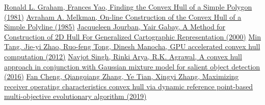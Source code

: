 \begin{thebibliography}{9}
    \href{https://mathweb.ucsd.edu/~ronspubs/83_09_convex_hull.pdf}
    {Ronald L. Graham, Frances Yao, Finding the Convex Hull of a Simple Polygon (1981)}
    \href{https://www.ime.usp.br/~walterfm/cursos/mac0331/2006/melkman.pdf}
    {Avraham A. Melkman, On-line Construction of the Convex Hull of a Simple Polyline (1985)}
    \href{https://www.isprs.org/proceedings/xxxiii/congress/part4/417_XXXIII-part4.pdf}
    {Jacqueleen Jourban, Yair Gabay, A Method for Construction of 2D Hull For Generalized Cartographic Representation (2000)}
    \href{https://www.sciencedirect.com/science/article/pii/S0097849312000544}
    {Min Tang, Jie-yi Zhao, Ruo-feng Tong, Dinesh Manocha, GPU accelerated convex hull computation (2012)}
     \href{https://www.sciencedirect.com/science/article/pii/S1051200416300318}
     {Navjot Singh, Rinki Arya, R.K. Agrawal, A convex hull approach in conjunction with Gaussian mixture model for salient object detection (2016)}
    \href{https://www.sciencedirect.com/science/article/pii/S1568494619306775}
    {Fan Cheng, Qiangqiang Zhang, Ye Tian, Xingyi Zhang, Maximizing receiver operating characteristics convex hull via dynamic reference point-based multi-objective evolutionary algorithm (2019)}
\end{thebibliography}